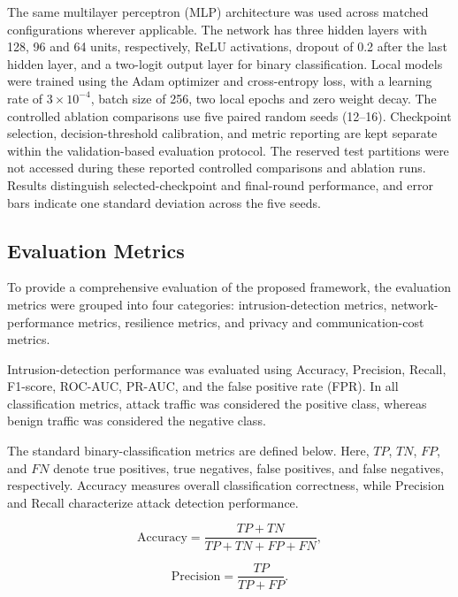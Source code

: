 \documentclass[5p,times,numafflabel]{elsarticle}
\begin{document}
The same multilayer perceptron (MLP) architecture was used across
matched configurations wherever applicable. The network has three
hidden layers with 128, 96 and 64 units, respectively, ReLU
activations, dropout of 0.2 after the last hidden layer, and a
two-logit output layer for binary classification. Local models
were trained using the Adam optimizer and cross-entropy loss,
with a learning rate of $3\times10^{-4}$, batch size of 256,
two local epochs and zero weight decay. The controlled
ablation comparisons use five paired random seeds (12--16).
Checkpoint selection, decision-threshold calibration, and metric
reporting are kept separate within the validation-based evaluation
protocol. The reserved test partitions were not accessed during
these reported controlled comparisons and ablation runs.
Results distinguish selected-checkpoint and final-round
performance, and error bars indicate one standard deviation
across the five seeds.

	
	\subsection{Evaluation Metrics}
	\label{subsec:evaluation-metrics}
	
	To provide a comprehensive evaluation of the proposed framework,
	the evaluation metrics were grouped into four categories:
	intrusion-detection metrics, network-performance metrics,
	resilience metrics, and privacy and communication-cost metrics.
	
	Intrusion-detection performance was evaluated using Accuracy,
	Precision, Recall, F1-score, ROC-AUC, PR-AUC, and the false
	positive rate (FPR). In all classification metrics, attack traffic
	was considered the positive class, whereas benign traffic was
	considered the negative class.
	
The standard binary-classification metrics are defined below.
Here, \(TP\), \(TN\), \(FP\), and \(FN\) denote true positives,
true negatives, false positives, and false negatives,
respectively. Accuracy measures overall classification
correctness, while Precision and Recall characterize
attack detection performance.

\begin{equation}
	\mathrm{Accuracy}
	=
	\frac{TP+TN}
	{TP+TN+FP+FN},
	\label{eq:accuracy}
\end{equation}

\begin{equation}
	\mathrm{Precision}
	=
	\frac{TP}{TP+FP}.
	\label{eq:precision}
\end{equation}
\end{document}

